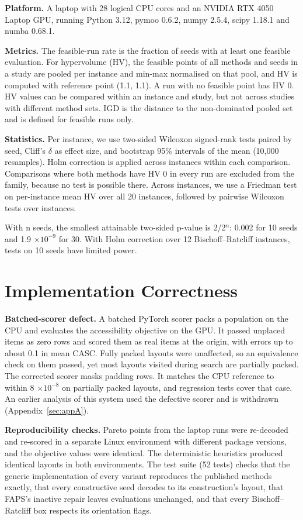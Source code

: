 \documentclass[journal]{IEEEtran}
\begin{document}
\textbf{Platform.} A laptop with 28 logical CPU cores and an NVIDIA RTX 4050 Laptop GPU, running Python 3.12, pymoo 0.6.2, numpy 2.5.4, scipy 1.18.1 and numba 0.68.1.

\textbf{Metrics.} The feasible-run rate is the fraction of seeds with at least one feasible evaluation. For hypervolume (HV), the feasible points of all methods and seeds in a study are pooled per instance and min-max normalised on that pool, and HV is computed with reference point (1.1, 1.1). A run with no feasible point has HV 0. HV values can be compared within an instance and study, but not across studies with different method sets. IGD is the distance to the non-dominated pooled set and is defined for feasible runs only.

\textbf{Statistics.} Per instance, we use two-sided Wilcoxon signed-rank tests paired by seed, Cliff's \(\delta\) as effect size, and bootstrap 95\% intervals of the mean (10,000 resamples). Holm correction is applied across instances within each comparison. Comparisons where both methods have HV 0 in every run are excluded from the family, because no test is possible there. Across instances, we use a Friedman test on per-instance mean HV over all 20 instances, followed by pairwise Wilcoxon tests over instances.

With n seeds, the smallest attainable two-sided p-value is 2/2\(^n\): 0.002 for 10 seeds and 1.9 \(\times 10^{-9}\) for 30. With Holm correction over 12 Bischoff--Ratcliff instances, tests on 10 seeds have limited power.

\section{Implementation Correctness}\label{sec:5}

\textbf{Batched-scorer defect.} A batched PyTorch scorer packs a population on the CPU and evaluates the accessibility objective on the GPU. It passed unplaced items as zero rows and scored them as real items at the origin, with errors up to about 0.1 in mean CASC. Fully packed layouts were unaffected, so an equivalence check on them passed, yet most layouts visited during search are partially packed. The corrected scorer masks padding rows. It matches the CPU reference to within 8 \(\times 10^{-8}\) on partially packed layouts, and regression tests cover that case. An earlier analysis of this system used the defective scorer and is withdrawn (Appendix~\ref{sec:appA}).

\textbf{Reproducibility checks.} Pareto points from the laptop runs were re-decoded and re-scored in a separate Linux environment with different package versions, and the objective values were identical. The deterministic heuristics produced identical layouts in both environments. The test suite (52 tests) checks that the generic implementation of every variant reproduces the published methods exactly, that every constructive seed decodes to its construction's layout, that FAPS's inactive repair leaves evaluations unchanged, and that every Bischoff--Ratcliff box respects its orientation flags.
\end{document}
